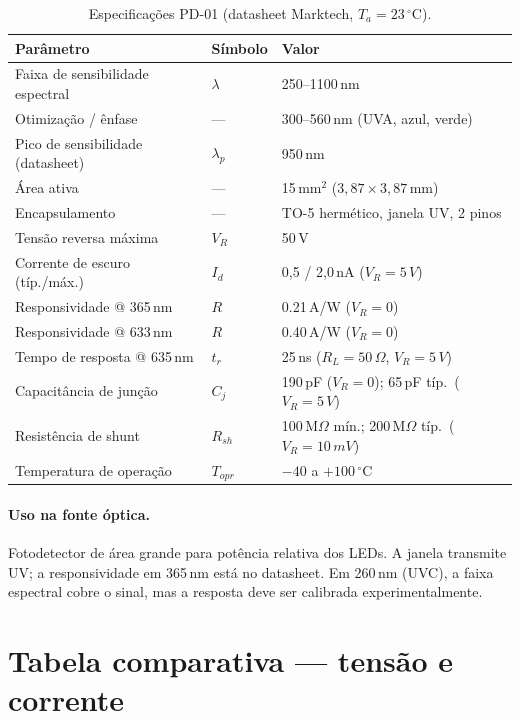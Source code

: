\documentclass[11pt,a4paper]{article}
\begin{document}
\begin{table}[ht]
\centering
\caption{Especificações PD-01 (datasheet Marktech, $T_a=23\,^\circ\mathrm{C}$).}
\begin{tabular}{@{}lll@{}}
\toprule
Parâmetro & Símbolo & Valor \\
\midrule
Faixa de sensibilidade espectral & $\lambda$ & 250--1100\,nm \\
Otimização / ênfase & --- & 300--560\,nm (UVA, azul, verde) \\
Pico de sensibilidade (datasheet) & $\lambda_p$ & 950\,nm \\
Área ativa & --- & 15\,mm$^2$ ($3{,}87\times3{,}87$\,mm) \\
Encapsulamento & --- & TO-5 hermético, janela UV, 2 pinos \\
Tensão reversa máxima & $V_R$ & 50\,V \\
Corrente de escuro (típ./máx.) & $I_d$ & 0{,}5 / 2{,}0\,nA ($V_R=5\,V$) \\
Responsividade @ 365\,nm & $R$ & 0.21\,A/W ($V_R=0$) \\
Responsividade @ 633\,nm & $R$ & 0.40\,A/W ($V_R=0$) \\
Tempo de resposta @ 635\,nm & $t_r$ & 25\,ns ($R_L=50\,\Omega$, $V_R=5\,V$) \\
Capacitância de junção & $C_j$ & 190\,pF ($V_R=0$); 65\,pF típ.\ ($V_R=5\,V$) \\
Resistência de shunt & $R_{sh}$ & 100\,M$\Omega$ mín.; 200\,M$\Omega$ típ.\ ($V_R=10\,mV$) \\
Temperatura de operação & $T_{opr}$ & $-40$ a $+100\,^\circ\mathrm{C}$ \\
\bottomrule
\end{tabular}
\end{table}

\paragraph{Uso na fonte óptica.}
Fotodetector de área grande para potência relativa dos LEDs. A janela
transmite UV; a responsividade em 365\,nm está no datasheet. Em 260\,nm
(UVC), a faixa espectral cobre o sinal, mas a resposta deve ser calibrada
experimentalmente.

\section{Tabela comparativa --- tensão e corrente}
\end{document}
